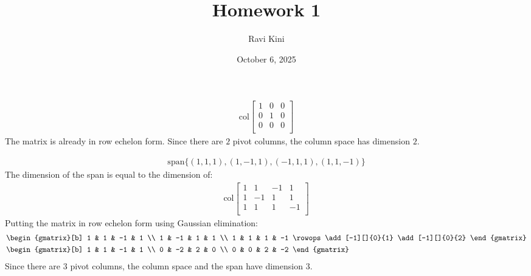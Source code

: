 \documentclass{article}
\title{Homework 1}
\author{Ravi Kini}
\date{October 6, 2025}
\begin{document}
\maketitle

\problem{}
\begin{align*}
    \mathrm{col} \begin{bmatrix}
        1 & 0 & 0 \\
        0 & 1 & 0 \\
        0 & 0 & 0 \\
    \end{bmatrix}
\end{align*}
The matrix is already in row echelon form. Since there are $2$ pivot columns, the column space has dimension $2$.

\begin{align*}
    \mathrm{span}\{(1, 1, 1), (1, -1, 1), (-1, 1, 1), (1, 1, -1)\}
\end{align*}
The dimension of the span is equal to the dimension of:
\begin{align*}
    \mathrm{col} \begin{bmatrix}
        1 & 1 & -1 & 1 \\
        1 & -1 & 1 & 1 \\
        1 & 1 & 1 & -1 \\
    \end{bmatrix}
\end{align*}
Putting the matrix in row echelon form using Gaussian elimination:
\begin{align*}
    & \begin{gmatrix}[b]
        1 & 1 & -1 & 1 \\
        1 & -1 & 1 & 1 \\
        1 & 1 & 1 & -1
    \rowops
    \add[-1][]{0}{1}
    \add[-1][]{0}{2}
    \end{gmatrix}  \\
    & \begin{gmatrix}[b]
        1 & 1 & -1 & 1 \\
        0 & -2 & 2 & 0 \\
        0 & 0 & 2 & -2
    \end{gmatrix} 
\end{align*}
Since there are $3$ pivot columns, the column space and the span have dimension $3$.
\end{document}
